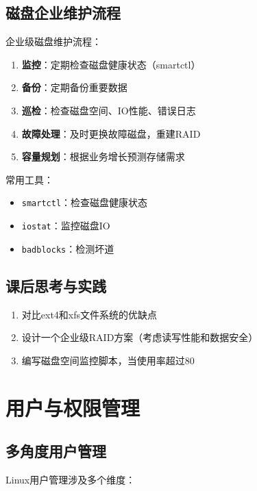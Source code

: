 \documentclass[12pt,UTF8]{ctexbook}
\begin{document}
\section{磁盘企业维护流程}
\label{sec:disk-maintenance}

企业级磁盘维护流程：

\begin{enumerate}
    \item \textbf{监控}：定期检查磁盘健康状态（smartctl）
    \item \textbf{备份}：定期备份重要数据
    \item \textbf{巡检}：检查磁盘空间、IO性能、错误日志
    \item \textbf{故障处理}：及时更换故障磁盘，重建RAID
    \item \textbf{容量规划}：根据业务增长预测存储需求
\end{enumerate}

常用工具：
\begin{itemize}
    \item \texttt{smartctl}：检查磁盘健康状态
    \item \texttt{iostat}：监控磁盘IO
    \item \texttt{badblocks}：检测坏道
\end{itemize}

\section{课后思考与实践}
\label{sec:storage-practice}
\begin{enumerate}
    \item 对比ext4和xfs文件系统的优缺点
    \item 设计一个企业级RAID方案（考虑读写性能和数据安全）
    \item 编写磁盘空间监控脚本，当使用率超过80%
\end{enumerate}

\chapter{用户与权限管理}
\label{chap:user-permission}

\section{多角度用户管理}
\label{sec:multi-angle-user}

Linux用户管理涉及多个维度：
\end{document}
